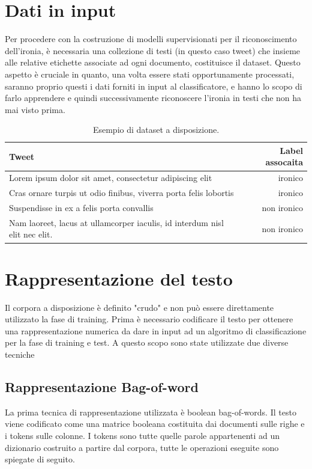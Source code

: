 \documentclass[oneside]{book}
\begin{document}
\clearpage

\section{Dati in input}

Per procedere con la costruzione di modelli supervisionati per il riconoscimento dell'ironia, è necessaria una collezione di testi (in questo caso tweet) che insieme alle relative etichette associate ad ogni documento, costituisce il dataset. Questo aspetto è cruciale in quanto, una volta essere stati opportunamente processati, saranno proprio questi i dati forniti in input al classificatore, e hanno lo scopo di farlo apprendere e quindi successivamente riconoscere l'ironia in testi che non ha mai visto prima.


\begin{table}[h!]
	\centering
	\begin{tabular}[t]{lr}
		\hline
		\textbf{Tweet} & \textbf{Label assocaita}\\
		\hline
		Lorem ipsum dolor sit amet, consectetur adipiscing elit & ironico     \\
		Cras ornare turpis ut odio finibus, viverra porta felis lobortis & ironico \\
		Suspendisse in ex a felis porta convallis & non ironico \\
		Nam laoreet, lacus at ullamcorper iaculis, id interdum nisl elit nec elit. & non ironico \\
		
		\hline
	\end{tabular}
	\caption{Esempio di dataset a disposizione.}
\end{table}%




\section{Rappresentazione del testo}
Il corpora a disposizione è definito "crudo" e non può essere direttamente utilizzato la fase di training. Prima è necessario codificare il testo per ottenere una rappresentazione numerica da dare in input ad un algoritmo di classificazione per la fase di training e test. A questo scopo sono state utilizzate due diverse tecniche

\subsection{Rappresentazione Bag-of-word}
La prima tecnica di rappresentazione utilizzata è boolean bag-of-words.
Il testo viene codificato come una matrice booleana costituita dai documenti sulle righe e i tokens sulle colonne. I tokens sono tutte quelle parole appartenenti ad un dizionario costruito a partire dal corpora, tutte le operazioni eseguite sono spiegate di seguito.
\end{document}

